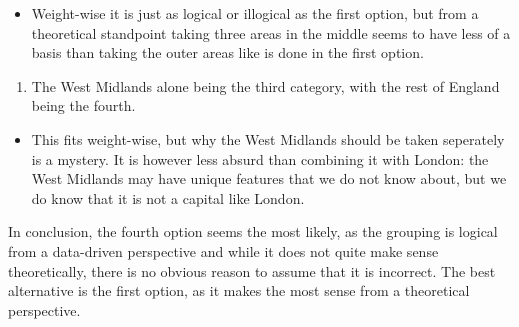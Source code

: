 \documentclass[]{article}
\providecommand{\tightlist}{%
  \setlength{\itemsep}{0pt}\setlength{\parskip}{0pt}}
\begin{document}
\begin{itemize}
\tightlist
\item
  Weight-wise it is just as logical or illogical as the first option,
  but from a theoretical standpoint taking three areas in the middle
  seems to have less of a basis than taking the outer areas like is done
  in the first option.
\end{itemize}

\begin{enumerate}
\def\labelenumi{\arabic{enumi}.}
\setcounter{enumi}{3}
\tightlist
\item
  The West Midlands alone being the third category, with the rest of
  England being the fourth.
\end{enumerate}

\begin{itemize}
\tightlist
\item
  This fits weight-wise, but why the West Midlands should be taken
  seperately is a mystery. It is however less absurd than combining it
  with London: the West Midlands may have unique features that we do not
  know about, but we do know that it is not a capital like London.
\end{itemize}

In conclusion, the fourth option seems the most likely, as the grouping
is logical from a data-driven perspective and while it does not quite
make sense theoretically, there is no obvious reason to assume that it
is incorrect. The best alternative is the first option, as it makes the
most sense from a theoretical perspective.
\end{document}
